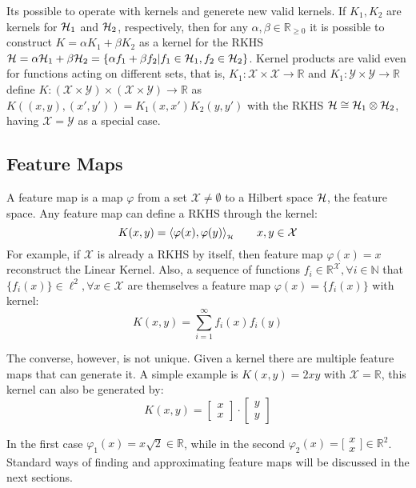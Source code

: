 Its possible to operate with kernels and generete new valid kernels. If
$K_1,K_2$ are kernels for $\mathcal{H}_1$ and $\mathcal{H}_2$, respectively, then for any
$\alpha,\beta \in \mathbb{R}_{\scriptstyle\geq0}$ it is possible to construct $K
= \alpha K_1 + \beta K_2$ as a kernel for the RKHS $\mathcal{H} = \alpha\mathcal{H}_1 +
\beta\mathcal{H}_2 = \{ \alpha f_1 + \beta f_2 | f_1 \in \mathcal{H}_1, f_2 \in
\mathcal{H}_2\}$. Kernel products are valid even for functions acting on different sets,
that is, $K_1:\mathcal{X}\times\mathcal{X}\to\mathbb{R}$ and
$K_1:\mathcal{Y}\times\mathcal{Y}\to\mathbb{R}$ define
$K:(\mathcal{X}\times\mathcal{Y})\times(\mathcal{X}\times\mathcal{Y})\to\mathbb{R}$
as $K((x,y),(x',y'))=K_1(x,x')K_2(y,y')$ with the RKHS $\mathcal{H} \cong \mathcal{H}_1 \otimes
\mathcal{H}_2$, having $\mathcal{X}=\mathcal{Y}$ as a special case.

\subsection{Feature Maps}

A feature map is a map $\varphi$ from a set $\mathcal{X}\neq\emptyset$ to a
Hilbert space $\mathcal{H}$, the feature space. Any feature map can define a RKHS
through the kernel:
\begin{equation}
\label{eq:feature_kernel}
K(x,y)=\langle \varphi(x),\varphi(y)\rangle_{_{\mathcal{H}}} \qquad x,y \in \mathcal{X}
\end{equation}
For example, if $\mathcal{X}$ is already a RKHS by itself, then feature
map $\varphi(x)=x$ reconstruct the Linear Kernel. Also, a sequence of functions
$f_i \in \mathbb{R}^\mathcal{X}, \forall i \in \mathbb{N}$ that $\{f_i(x)\}
\in \ell^2, \forall x \in \mathcal{X}$ are themselves a feature map
$\varphi(x)=\{f_i(x)\}$ with kernel:
\begin{equation*}
K(x,y) = \sum_{i=1}^\infty f_i(x) f_i(y)
\end{equation*}

The converse, however, is not unique. Given a kernel there are multiple feature
maps that can generate it. A simple example is $K(x,y)=2xy$ with
$\mathcal{X}=\mathbb{R}$, this kernel can also be generated by:
\begin{equation*}
K(x,y) = \begin{bmatrix}x \\ x\end{bmatrix}\cdot\begin{bmatrix}y \\
y\end{bmatrix}
\end{equation*}

In the first case $\varphi_1(x)=x {\scriptstyle\sqrt{2}} \in \mathbb{R}$, while
in the second $\varphi_2(x)=\bigl[\begin{smallmatrix}x \\
x\end{smallmatrix}\bigr] \in \mathbb{R}^2$. Standard ways of finding and
approximating feature maps will be discussed in the next sections.